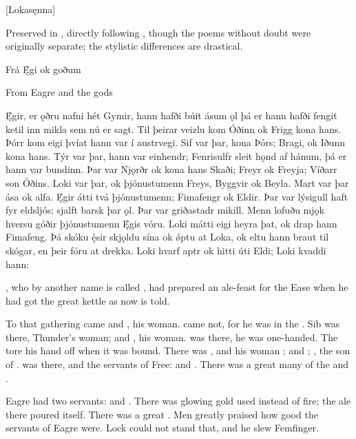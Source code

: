 [Lokasęnna]

Preserved in \Regius, directly following \Hymiskvida, though the poems without doubt were originally separate; the stylistic differences are drastical.

Frá Ę́gi ok goðum

From Eagre and the gods

Ę́gir, er ǫðru nafni hét Gymir, hann hafði búit ásum ǫl þá er hann hafði fengit ketil inn mikla sem nú er sagt. Til þeirar veizlu kom Óðinn ok Frigg kona hans. Þórr kom eigi þvíat hann var í austrvegi. Sif var þar, kona Þórs; Bragi, ok Iðunn kona hans. Týr var þar, hann var einhendr; Fenrisulfr sleit hǫnd af hánum, þá er hann var bundinn. Þar var Njǫrðr ok kona hans Skaði; Freyr ok Freyja; Víðarr son Óðins. Loki var þar, ok þjónustumenn Freys, Byggvir ok Beyla. Mart var þar ása ok alfa. Ę́gir átti tvá þjónustumenn; Fimafengr ok Eldir. Þar var lýsigull haft fyr eldsljós; sjalft barsk þar ǫl. Þar var griðastadr mikill. Menn lofuðu mjǫk hversu góðir þjónustumenn Ę́gis vóru. Loki mátti eigi heyra þat, ok drap hann Fimafeng. Þá skóku ę́sir skjǫldu sína ok ǿptu at Loka, ok eltu hann braut til skógar, en þeir fóru at drekka. Loki hvarf aptr ok hitti úti Eldi; Loki kvaddi hann:

, who by another name is called , had prepared an ale-feast for the Ease when he had got the great kettle as now is told.

To that gathering came  and , his woman.  came not, for he was in the . Sib was there, Thunder’s woman;  and , his woman.  was there, he was one-handed. The  tore his hand off when it was bound. There was , and his woman ;  and ; , the son of .  was there, and the servants of Free:  and . There was a great many of the  and .

Eagre had two servants:  and . There was glowing gold used instead of fire; the ale there poured itself. There was a great . Men greatly praised how good the servants of Eagre were. Lock could not stand that, and he slew Femfinger.

